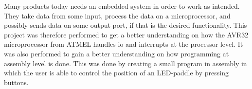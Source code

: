 Many products today needs an embedded system in order to work as
intended. They take data from some input, process the data on a
microprocessor, and possibly sends data on some output-port, if that is
the desired functionality. This project was therefore performed to get a
better understanding on how the AVR32 microprocessor from ATMEL handles
io and interrupts at the processor level. It was also performed to gain
a better understanding on how programming at assembly level is done.
This was done by creating a small program in assembly in which the user
is able to control the position of an LED-paddle by pressing buttons. 

\begin{comment}
TODO:
- hva fant vi ut av?
- rask konklusjon 
\end{comment}

